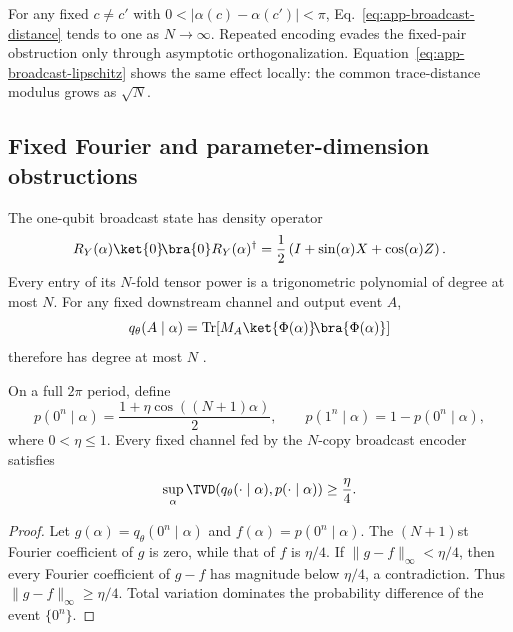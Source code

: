 For any fixed $c\neq c'$ with
$0<|\alpha(c)-\alpha(c')|<\pi$,
Eq.~\eqref{eq:app-broadcast-distance} tends to one as $N\to\infty$.
Repeated encoding evades the fixed-pair obstruction only through asymptotic
orthogonalization. Equation~\eqref{eq:app-broadcast-lipschitz} shows the same
effect locally: the common trace-distance modulus grows as $\sqrt N$.

\subsection{Fixed Fourier and parameter-dimension obstructions}

The one-qubit broadcast state has density operator
\begin{equation}
 R_Y(\alpha)\ket{0}\!\bra{0}R_Y(\alpha)^\dagger
 =\frac12\left(I+\sin(\alpha)X+\cos(\alpha)Z\right).
 \label{eq:app-bloch-rotation}
\end{equation}
Every entry of its $N$-fold tensor power is a trigonometric polynomial of
degree at most $N$. For any fixed downstream channel and output event $A$,
\begin{equation}
 q_\theta(A\mid\alpha)
 =\operatorname{Tr}\!\left[
 M_A\ket{\Phi(\alpha)}\!\bra{\Phi(\alpha)}\right]
 \label{eq:app-event-polynomial}
\end{equation}
therefore has degree at most $N$
\cite{schuldEffectDataEncoding2021,casasMultidimensionalFourier2023}.

\begin{proposition}
\label{prop:app-fourier}
On a full $2\pi$ period, define
\begin{equation}
 p(0^n\mid\alpha)=
 \frac{1+\eta\cos((N+1)\alpha)}{2},
 \qquad
 p(1^n\mid\alpha)=1-p(0^n\mid\alpha),
 \label{eq:app-fourier-target}
\end{equation}
where $0<\eta\leq1$. Every fixed channel fed by the $N$-copy broadcast
encoder satisfies
\begin{equation}
 \sup_\alpha\TVD\!\left(
 q_\theta(\cdot\mid\alpha),p(\cdot\mid\alpha)\right)
 \geq\frac{\eta}{4}.
 \label{eq:app-fourier-gap}
\end{equation}
\end{proposition}

\begin{proof}
Let $g(\alpha)=q_\theta(0^n\mid\alpha)$ and
$f(\alpha)=p(0^n\mid\alpha)$. The $(N+1)$st Fourier coefficient of $g$ is
zero, while that of $f$ is $\eta/4$. If
$\lVert g-f\rVert_\infty<\eta/4$, then every Fourier coefficient of $g-f$
has magnitude below $\eta/4$, a contradiction. Thus
$\lVert g-f\rVert_\infty\geq\eta/4$. Total variation dominates the
probability difference of the event $\{0^n\}$.
\end{proof}

